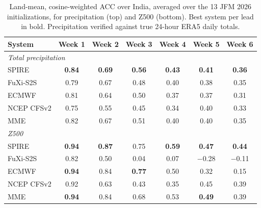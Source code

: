 \documentclass[11pt]{article}
\begin{document}
\begin{table}[t]
  \centering
  \small
  \caption{Land-mean, cosine-weighted ACC over India, averaged over the
  13 JFM 2026 initializations, for precipitation (top) and Z500 (bottom).
  Best system per lead in bold. Precipitation verified against true
  24-hour ERA5 daily totals.}
  \label{tab:acc}
  \setlength{\tabcolsep}{5pt}
  \begin{tabular}{lcccccc}
    \toprule
    System & Week 1 & Week 2 & Week 3 & Week 4 & Week 5 & Week 6 \\
    \midrule
    \multicolumn{7}{l}{\emph{Total precipitation}}\\
    SPIRE        & \textbf{0.84} & \textbf{0.69} & \textbf{0.56} & \textbf{0.43} & \textbf{0.41} & \textbf{0.36} \\
    FuXi-S2S     & 0.79 & 0.67 & 0.48 & 0.40 & 0.38 & 0.35 \\
    ECMWF        & 0.81 & 0.64 & 0.50 & 0.37 & 0.37 & 0.31 \\
    NCEP CFSv2   & 0.75 & 0.55 & 0.45 & 0.34 & 0.40 & 0.33 \\
    MME          & 0.82 & 0.67 & 0.51 & 0.40 & 0.40 & 0.35 \\
    \midrule
    \multicolumn{7}{l}{\emph{Z500}}\\
    SPIRE        & \textbf{0.94} & \textbf{0.87} & 0.75          & \textbf{0.59} & \textbf{0.47} & \textbf{0.44} \\
    FuXi-S2S     & 0.82 & 0.50 & 0.04          & 0.07          & $-$0.28       & $-$0.11 \\
    ECMWF        & \textbf{0.94} & 0.84 & \textbf{0.77} & 0.50 & 0.32          & 0.15 \\
    NCEP CFSv2   & 0.92 & 0.63 & 0.43          & 0.35          & 0.45          & 0.39 \\
    MME          & \textbf{0.94} & 0.84 & 0.68 & 0.53 & \textbf{0.49} & 0.39 \\
    \bottomrule
  \end{tabular}
\end{table}
\end{document}
